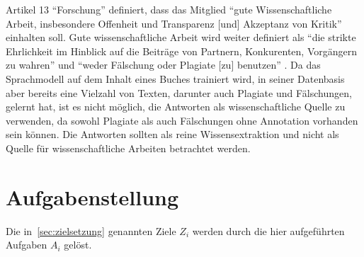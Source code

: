 Artikel 13 \enquote{Forschung} definiert, dass das Mitglied \enquote{gute Wissenschaftliche Arbeit, insbesondere Offenheit und Transparenz [und] Akzeptanz von Kritik} \citep{gmds_eth} einhalten soll.
Gute wissenschaftliche Arbeit wird weiter definiert als
\enquote{die strikte Ehrlichkeit im Hinblick auf die Beiträge von Partnern, Konkurenten, Vorgängern zu wahren} und \enquote{weder Fälschung oder Plagiate [zu] benutzen} \citep{gmds_eth}.
Da das Sprachmodell auf dem Inhalt eines Buches trainiert wird, in seiner Datenbasis aber bereits eine Vielzahl von Texten, darunter auch Plagiate und Fälschungen, gelernt hat,
ist es nicht möglich, die Antworten als wissenschaftliche Quelle zu verwenden, da sowohl Plagiate als auch Fälschungen ohne Annotation vorhanden sein können.
Die Antworten sollten als reine Wissensextraktion und nicht als Quelle für wissenschaftliche Arbeiten betrachtet werden.

\section{Aufgabenstellung}

Die in~\cref{sec:zielsetzung} genannten Ziele $Z_i$ werden durch die hier aufgeführten Aufgaben $A_i$ gelöst.

